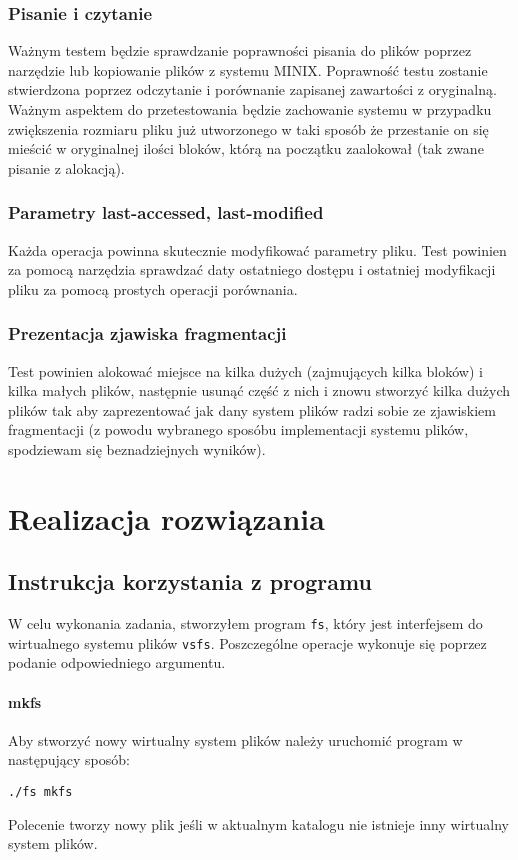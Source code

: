 \documentclass{mwrep}
\begin{document}
\subsection{Pisanie i czytanie}
Ważnym testem będzie sprawdzanie poprawności pisania do plików poprzez narzędzie lub kopiowanie plików z systemu MINIX. 
Poprawność testu zostanie stwierdzona poprzez odczytanie i porównanie zapisanej zawartości z oryginalną.
Ważnym aspektem do przetestowania będzie zachowanie systemu w przypadku zwiększenia rozmiaru pliku już utworzonego
w taki sposób że przestanie on się mieścić w oryginalnej ilości bloków, którą na początku zaalokował (tak zwane pisanie z alokacją).  

\subsection{Parametry last-accessed, last-modified}
Każda operacja powinna skutecznie modyfikować parametry pliku. Test powinien za pomocą narzędzia sprawdzać daty ostatniego
dostępu i ostatniej modyfikacji pliku za pomocą prostych operacji porównania. 

\subsection{Prezentacja zjawiska fragmentacji}
Test powinien alokować miejsce na kilka dużych (zajmujących kilka bloków) i kilka małych plików, następnie usunąć część z nich 
i znowu stworzyć kilka dużych plików tak aby zaprezentować jak dany system plików radzi sobie ze zjawiskiem fragmentacji 
(z powodu wybranego sposóbu implementacji systemu plików, spodziewam się beznadziejnych wyników).

\chapter{Realizacja rozwiązania}
\section{Instrukcja korzystania z programu}
W celu wykonania zadania, stworzyłem program \texttt{fs}, który jest interfejsem do wirtualnego
systemu plików \texttt{vsfs}. Poszczególne operacje wykonuje się poprzez podanie odpowiedniego argumentu.

\subsubsection{mkfs}
Aby stworzyć nowy wirtualny system plików należy uruchomić program w następujący sposób:
\begin{center}
    \texttt{./fs mkfs}
\end{center}
Polecenie tworzy nowy plik jeśli w aktualnym katalogu nie istnieje inny wirtualny system plików.
\end{document}

